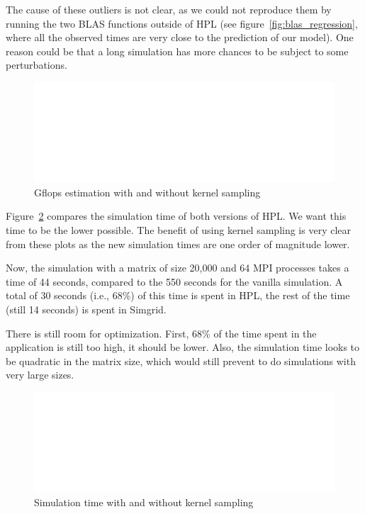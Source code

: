 \documentclass[12pt, a4paper]{memoir}
\begin{document}
The cause of these outliers is not clear, as we could not reproduce them by running the two BLAS functions outside of
HPL (see figure~\ref{fig:blas_regression}, where all the observed times are very close to the prediction of our
model). One reason could be that a long simulation has more chances to be subject to some perturbations.

\begin{figure}[htpb]
\centering
\includegraphics[width=\linewidth,page=2]{../validation/L1/report_plot_gflops.pdf}
\caption{Gflops estimation with and without kernel sampling}
\label{fig:L1_gflops}
\end{figure}

Figure~\ref{fig:L1_simulation_time} compares the simulation time of both versions of HPL. We want this time to be
the lower possible. The benefit of using kernel sampling is very clear from these plots as the new simulation times
are one order of magnitude lower.

Now, the simulation with a matrix of size 20,000 and 64 MPI processes takes a time of 44 seconds, compared to the
550 seconds for the vanilla simulation. A total of 30 seconds (i.e., 68\%) of this time is spent in HPL, the rest of
the time (still 14 seconds) is spent in Simgrid.

There is still room for optimization. First, 68\% of the time spent in the application is still too high, it should be
lower. Also, the simulation time looks to be quadratic in the matrix size, which would still prevent to do
simulations with very large sizes.

\begin{figure}[htpb]
\centering
\includegraphics[width=\linewidth,page=2]{../validation/L1/report_plot_time.pdf}
\caption{Simulation time with and without kernel sampling}
\label{fig:L1_simulation_time}
\end{figure}
\end{document}
